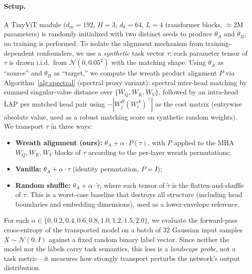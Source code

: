 \paragraph{Setup.} A TinyViT module ($d_m = 192$, $H = 3$, $d_k = 64$, $L = 4$ transformer blocks, $\approx$2M parameters) is randomly initialized with two distinct seeds to produce $\theta_A$ and $\theta_B$; no training is performed. To isolate the alignment mechanism from training-dependent confounders, we use a \emph{synthetic} task vector $\tau$: each parameter tensor of $\tau$ is drawn i.i.d.\ from $\mathcal{N}(0, 0.05^2)$ with the matching shape. Using $\theta_A$ as ``source'' and $\theta_B$ as ``target,'' we compute the wreath product alignment $P$ via Algorithm~\ref{alg:spectral} (spectral proxy variant): spectral inter-head matching by summed singular-value distance over $\{W_Q, W_K, W_V\}$, followed by an intra-head LAP per matched head pair using $-|W^B_j (W^A_i)^\top|$ as the cost matrix (entrywise absolute value, used as a robust matching score on synthetic random weights). We transport $\tau$ in three ways:
\begin{itemize}[nosep]
    \item \textbf{Wreath alignment (ours):} $\theta_A + \alpha \cdot P(\tau)$, with $P$ applied to the MHA $W_Q, W_K, W_V$ blocks of $\tau$ according to the per-layer wreath permutations;
    \item \textbf{Vanilla:} $\theta_A + \alpha \cdot \tau$ (identity permutation, $P = I$);
    \item \textbf{Random shuffle:} $\theta_A + \alpha \cdot \tilde{\tau}$, where each tensor of $\tilde{\tau}$ is the flatten-and-shuffle of $\tau$. This is a worst-case baseline that destroys all structure (including head boundaries and embedding dimensions), used as a lower-envelope reference.
\end{itemize}
For each $\alpha \in \{0, 0.2, 0.4, 0.6, 0.8, 1.0, 1.2, 1.5, 2.0\}$, we evaluate the forward-pass cross-entropy of the transported model on a batch of $32$ Gaussian input samples $X \sim \mathcal{N}(0, I)$ against a fixed random binary label vector. Since neither the model nor the labels carry task semantics, this loss is a \emph{landscape probe}, not a task metric---it measures how strongly transport perturbs the network's output distribution.


